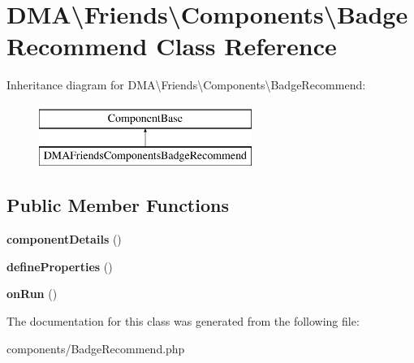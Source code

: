 \hypertarget{classDMA_1_1Friends_1_1Components_1_1BadgeRecommend}{\section{D\+M\+A\textbackslash{}Friends\textbackslash{}Components\textbackslash{}Badge\+Recommend Class Reference}
\label{classDMA_1_1Friends_1_1Components_1_1BadgeRecommend}
}
Inheritance diagram for D\+M\+A\textbackslash{}Friends\textbackslash{}Components\textbackslash{}Badge\+Recommend\+:\begin{figure}[H]
\begin{center}
\leavevmode
\includegraphics[height=2.000000cm]{d2/dbd/classDMA_1_1Friends_1_1Components_1_1BadgeRecommend}
\end{center}
\end{figure}
\subsection*{Public Member Functions}
\begin{DoxyCompactItemize}
\item 
\hypertarget{classDMA_1_1Friends_1_1Components_1_1BadgeRecommend_a851a204784cf3f70c0f3471a37b88a4d}{{\bfseries component\+Details} ()}\label{classDMA_1_1Friends_1_1Components_1_1BadgeRecommend_a851a204784cf3f70c0f3471a37b88a4d}

\item 
\hypertarget{classDMA_1_1Friends_1_1Components_1_1BadgeRecommend_a7678b0bc4e68fd30e61c052562d8df2f}{{\bfseries define\+Properties} ()}\label{classDMA_1_1Friends_1_1Components_1_1BadgeRecommend_a7678b0bc4e68fd30e61c052562d8df2f}

\item 
\hypertarget{classDMA_1_1Friends_1_1Components_1_1BadgeRecommend_acca807fdbef2adc92f6c0a7765ce0dde}{{\bfseries on\+Run} ()}\label{classDMA_1_1Friends_1_1Components_1_1BadgeRecommend_acca807fdbef2adc92f6c0a7765ce0dde}

\end{DoxyCompactItemize}


The documentation for this class was generated from the following file\+:\begin{DoxyCompactItemize}
\item 
components/Badge\+Recommend.\+php\end{DoxyCompactItemize}
